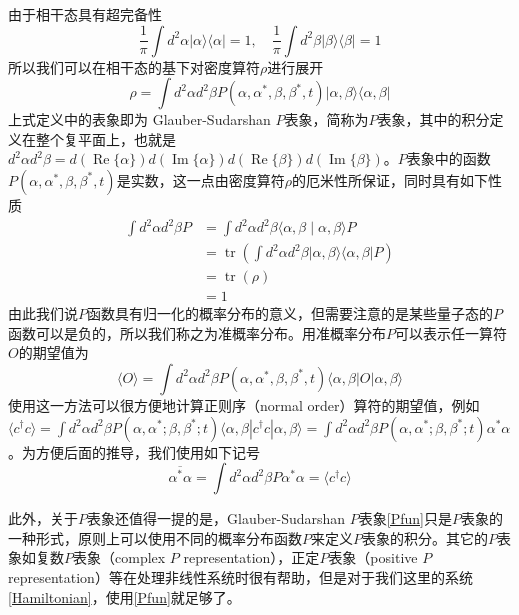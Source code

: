 由于相干态具有超完备性
\begin{equation}
\frac{1}{\pi} \int d^{2} \alpha|\alpha\rangle\langle\alpha|=1, \quad
\frac{1}{\pi} \int d^{2} \beta|\beta\rangle\langle\beta|=1
\end{equation}
所以我们可以在相干态的基下对密度算符$\rho$进行展开
\begin{equation}
\rho=\int d^{2}\alpha d^{2}\beta P(\alpha,\alpha^{*},\beta,\beta^{*},t)|\alpha,\beta\rangle \langle \alpha,\beta| \label{Pfun} 
\end{equation}
上式定义中的表象即为 Glauber-Sudarshan $P$表象，简称为$P$表象，其中的积分定义在整个复平面上，也就是$d^{2} \alpha d^{2} \beta=d(\operatorname{Re}\{\alpha\}) d(\operatorname{Im}\{\alpha\}) d(\operatorname{Re}\{\beta\}) d(\operatorname{Im}\{\beta\})$。$P$表象中的函数$P(\alpha,\alpha^{*},\beta,\beta^{*},t)$是实数，这一点由密度算符$\rho$的厄米性所保证，同时具有如下性质
\begin{equation}
\begin{aligned}
\int d^{2} \alpha d^{2}\beta P &=\int d^{2} \alpha d^{2}\beta \langle\alpha,\beta \mid \alpha,\beta \rangle P \\
&=\operatorname{tr}\left(\int d^{2} \alpha d^{2}\beta |\alpha,\beta\rangle\langle\alpha,\beta| P\right) \\
&=\operatorname{tr}(\rho) \\
&=1
\end{aligned}
\end{equation}
由此我们说$P$函数具有归一化的概率分布的意义，但需要注意的是某些量子态的$P$函数可以是负的，所以我们称之为准概率分布。用准概率分布$P$可以表示任一算符$O$的期望值为
\begin{equation}
\langle{O}\rangle=\int d^{2}\alpha d^{2}\beta P(\alpha,\alpha^{*},\beta,\beta^{*},t)\langle \alpha,\beta|O|\alpha,\beta\rangle
\end{equation}
使用这一方法可以很方便地计算正则序（normal order）算符的期望值，例如$\langle c^{\dagger}c \rangle = \int d^{2}\alpha d^{2}\beta P(\alpha,\alpha^{*};\beta,\beta^{*};t) \langle \alpha,\beta|c^{\dagger}c|\alpha,\beta\rangle = \int d^{2}\alpha d^{2}\beta P(\alpha,\alpha^{*};\beta,\beta^{*};t)\alpha^{*}\alpha$。为方便后面的推导，我们使用如下记号
\begin{equation}
\overline{\alpha^{*}\alpha} = \int d^{2}\alpha d^{2}\beta P\alpha^{*}\alpha = \langle c^{\dagger}c \rangle
\label{MeanDefination}
\end{equation}

此外，关于$P$表象还值得一提的是，Glauber-Sudarshan $P$表象\eqref{Pfun}只是$P$表象的一种形式，原则上可以使用不同的概率分布函数$P$来定义$P$表象的积分\cite{walls2007quantum}。其它的$P$表象如复数$P$表象（complex $P$ representation），正定$P$表象（positive $P$ representation）等在处理非线性系统时很有帮助，但是对于我们这里的系统 \eqref{Hamiltonian}，使用\eqref{Pfun}就足够了。


